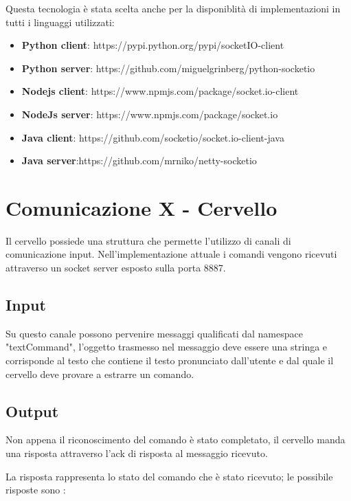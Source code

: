 \documentclass[twoside]{supsistudent}
\begin{document}
Questa tecnologia è stata scelta anche per la disponiblità di implementazioni in tutti i linguaggi utilizzati:
\begin{itemize}
	\item \textbf{Python client}: https://pypi.python.org/pypi/socketIO-client
	\item \textbf{Python server}: https://github.com/miguelgrinberg/python-socketio
	\item \textbf{Nodejs client}: https://www.npmjs.com/package/socket.io-client
	\item \textbf{NodeJs server}: https://www.npmjs.com/package/socket.io
	\item \textbf{Java client}: https://github.com/socketio/socket.io-client-java
	\item \textbf{Java server}:https://github.com/mrniko/netty-socketio
\end{itemize}

\chapter{Comunicazione X - Cervello }
Il cervello possiede una struttura che permette l'utilizzo di canali di comunicazione input. Nell'implementazione attuale i comandi vengono ricevuti attraverso un socket server esposto sulla porta 8887.
\section{Input}
Su questo canale possono pervenire messaggi qualificati dal namespace "textCommand", l'oggetto trasmesso nel messaggio deve essere una stringa e corrisponde al testo che contiene il testo pronunciato dall'utente e dal quale il cervello deve provare a estrarre un comando.
\section{Output}
Non appena il riconoscimento del comando è stato completato, il cervello manda una risposta attraverso l'ack di risposta al messaggio ricevuto.

La risposta rappresenta lo stato del comando che è stato ricevuto; le possibile risposte sono :
\end{document}
